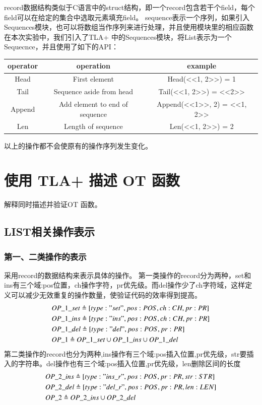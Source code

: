 record数据结构类似于C语言中的struct结构，即一个record包含若干个field，每个field可以在给定的集合中选取元素填充field。
sequence表示一个序列，如果引入Sequences模块，也可以将数组当作序列来进行处理，并且使用模块里的相应函数
在本次实验中，我们引入了TLA+ 中的Sequences模块，将List表示为一个Sequecnce，并且使用了如下的API：\\
\begin{tabular}{ccc}
\hline
operator& operation& example \\
\hline  
 Head& First element &Head(<<1, 2>>) = 1\\
 Tail& Sequence aside from head &Tail(<<1, 2>>) = <<2>>\\
 Append& Add element to end of sequence &Append(<<1>>, 2) = <<1, 2>>\\ 
 Len& Length of sequence &Len(<<1, 2>>) = 2\\
\hline %
\end{tabular}
以上的操作都不会使原有的操作序列发生变化。

\section{使用 TLA+ 描述 OT 函数}
解释同时描述并验证OT 函数。	 	
\subsection{LIST相关操作表示}
\subsubsection{第一、二类操作的表示}
采用record的数据结构来表示具体的操作。
第一类操作的record分为两种，set和ins有三个域:pos位置，ch操作字符，pr优先级。而del操作少了ch字符域，这样定义可以减少无效重复的操作数量，使验证代码的效率得到提高。
\begin{align*}
&OP\_1\_set \triangleq [type: {"set"}, pos: POS, ch: CH, pr:PR] \\
&OP\_1\_ins \triangleq [type: {"ins"}, pos: POS, ch: CH, pr:PR] \\
&OP\_1\_del \triangleq [type: {"del"}, pos: POS, pr:PR] \\
&OP\_1 \triangleq OP\_1\_set \cup OP\_1\_ins \cup OP\_1\_del\\
\end{align*}
第二类操作的record也分为两种,ins操作有三个域:pos插入位置,pr优先级，str要插入的字符串。del操作也有三个域:pos插入位置,pr优先级，len删除区间的长度
\begin{align*}
&OP\_2\_ins \triangleq [type: {"ins\_r"}, pos: POS, pr:PR, str:STR] \\
&OP\_2\_del \triangleq [type: {"del\_r"}, pos: POS, pr:PR, len:LEN] \\
&OP\_2 \triangleq  OP\_2\_ins \cup OP\_2\_del \\
\end{align*}

